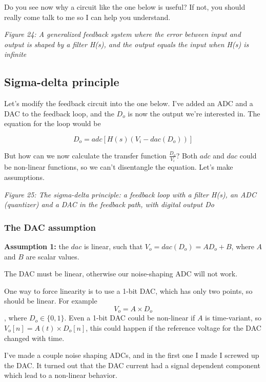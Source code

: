 Do you see now why a circuit like the one below is useful? If not, you
should really come talk to me so I can help you understand.


{
\centering
{}
}

\emph{Figure 24: A generalized feedback system where the error between
input and output is shaped by a filter H(s), and the output equals the
input when H(s) is infinite}

\subsection{Sigma-delta principle}\label{sigma-delta-principle}

Let's modify the feedback circuit into the one below. I've added an ADC
and a DAC to the feedback loop, and the \(D_o\) is now the output we're
interested in. The equation for the loop would be

\[
D_o = adc\left[H(s)\left(V_i - dac(D_o)\right)\right]
\]

But how can we now calculate the transfer function \(\frac{D_o}{V_i}\)?
Both \(adc\) and \(dac\) could be non-linear functions, so we can't
disentangle the equation. Let's make assumptions.


{
\centering
{}
}

\emph{Figure 25: The sigma-delta principle: a feedback loop with a
filter H(s), an ADC (quantizer) and a DAC in the feedback path, with
digital output Do}

\subsubsection{The DAC assumption}\label{the-dac-assumption}

\textbf{Assumption 1:} the \(dac\) is linear, such that
\(V_o = dac(D_o) = A  D_o + B\), where \(A\) and \(B\) are scalar
values.

The DAC must be linear, otherwise our noise-shaping ADC will not work.

One way to force linearity is to use a 1-bit DAC, which has only two
points, so should be linear. For example \[ V_o = A \times D_o\], where
\(D_o \in \{0,1\}\). Even a 1-bit DAC could be non-linear if \(A\) is
time-variant, so \(V_o[n] = A(t)\times D_o[n]\), this could happen if
the reference voltage for the DAC changed with time.

I've made a couple noise shaping ADCs, and in the first one I made I
screwed up the DAC. It turned out that the DAC current had a signal
dependent component which lead to a non-linear behavior.

